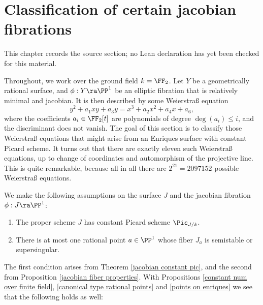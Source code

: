 \chapter{Classification of certain jacobian fibrations}
\label{no-enriques-surface-over-the-integers-chapter-11}

\begin{remark}
\label{no-enriques-surface-over-the-integers-chapter-11-source}
This chapter records the source section; no Lean declaration has yet been checked for this material.
\notready
\end{remark}

\label{Classification jacobian}

Throughout, we work over the ground field $k=\FF_2$.
Let $Y$ be a geometrically rational surface, and $\phi:Y\ra\PP^1$ be an elliptic fibration that
is relatively minimal and jacobian. It is then described by some Weierstra\ss{} equation
$$
y^2+a_1xy+a_3y = x^3+a_2x^2+a_4x+a_6,
$$
where the coefficients $a_i\in \FF_2[t]$ are polynomials of degree $\deg(a_i)\leq i$, and the discriminant does not vanish.
The goal of this section is to classify those Weierstra\ss{} equations that might arise from
an Enriques surface with constant Picard scheme.
It turns out that there are exactly eleven such Weierstra\ss{} equations, up to change of coordinates and
automorphism of the projective line.
This is quite remarkable, because all in all there are $2^{21}=2097152$ possible Weierstra\ss{} equations.

We make the following assumptions on the surface $J$ and the jacobian fibration $\phi:J\ra\PP^1$:
\begin{enumerate}
\item
\label{constant}
The proper scheme $J$ has constant   Picard scheme $\Pic_{J/k}$.
\item
\label{rational}
There is at most one rational point $a\in\PP^1$ whose fiber $J_a$   is semistable or supersingular.
\end{enumerate}

The first condition arises from Theorem \ref{jacobian constant pic}, and the second from Proposition \ref{jacobian fiber properties}.
With Propositions \ref{constant num over finite field}, \ref{canonical type rational points} and \ref{points on enriques}
we see that   the following holds as well:

